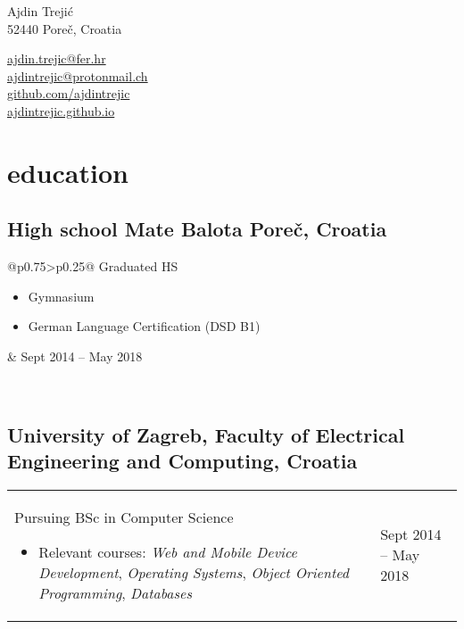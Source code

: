 \documentclass[a4paper]{article}
\makeatletter
\newlength{\tablewidth}
\newenvironment{period}[2]{%
\newcommand{\sarma}{#2}%
\setlength{\tablewidth}{\linewidth}
\addtolength{\tablewidth}{-2\tabcolsep}
\begin{tabular}{@{}p{0.75\tablewidth}>{\raggedleft\arraybackslash}p{0.25\tablewidth}@{}}%
#1 \newline
\begin{itemize}
}{%
\end{itemize} & \sarma \\%
\end{tabular}\\
}
\makeatother
\begin{document}
\fontfamily{\sfdefault}
\selectfont

\begin{minipage}{.5\textwidth}
\LARGE{Ajdin Trejić}\\
\normalsize{52440 Poreč, Croatia}
\end{minipage}%
\begin{minipage}{.5\textwidth}
\raggedleft
\href{mailto:ajdin.trejic@fer.hr}{ajdin.trejic@fer.hr} \\
\href{mailto:ajdintrejic@protonmail.ch}{ajdintrejic@protonmail.ch} \\
\href{https://github.com/ajdintrejic}{github.com/ajdintrejic} \\
\href{ajdintrejic.github.io}{ajdintrejic.github.io}
\end{minipage}

\vspace{1em}

\section{education}

\subsection{High school Mate Balota Poreč, Croatia}
\begin{period}{Graduated HS}{Sept 2014 -- May 2018}
\item Gymnasium
\item German Language Certification (DSD B1)
\end{period}

\subsection{University of Zagreb, Faculty of Electrical Engineering and Computing, Croatia}
\begin{period}{Pursuing BSc in Computer Science}{Sep 2018 -- May 2021\linebreak(expected)}
    \item Relevant courses:
        \textit{Web and Mobile Device Development},
        \textit{Operating Systems},
        \textit{Object Oriented Programming},
        \textit{Databases}
\end{period}
\iffalse
\begin{period}{BSc in Computer Science}{Sep 2008 -- Jul 2011}
    \item thesis:
        \textit{GPU implementation of a space and time optimal parallel sequence alignment algorithm}
    \item completed optional course \textit{Competitive programming} (rank 3/40)
\end{period}
\fi
\end{document}
